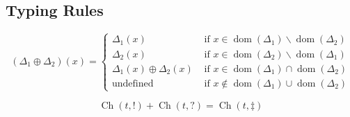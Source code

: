 \documentclass[master,english]{kuisthesis}
\theoremstyle{definition}
\begin{document}
\newcommand{\R}[1]{\Code{R}({#1})}


\subsection{Typing Rules}

$$
\left(\Delta_1 \oplus \Delta_2\right)(x)= \begin{cases}\Delta_1(x) & \text { if } x \in \operatorname{dom}\left(\Delta_1\right)\backslash \operatorname{dom}\left(\Delta_2\right) \\ \Delta_2(x) & \text { if } x \in \operatorname{dom}\left(\Delta_2\right) \backslash \operatorname{dom}\left(\Delta_1\right) \\ \Delta_1(x) \oplus \Delta_2(x) & \text { if } x\in \operatorname{dom}\left(\Delta_1\right) \cap \operatorname{dom}\left(\Delta_2\right) \\ \text {undefined } & \text { if } x \notin \operatorname{dom}\left(\Delta_1\right) \cup \operatorname{dom}\left(\Delta_2\right)\end{cases}
$$

$$
\operatorname{Ch}\left(t, !\right)+\operatorname{Ch}(t, ?)=\operatorname{Ch}\left(t, \ddagger\right)
$$
\end{document}
